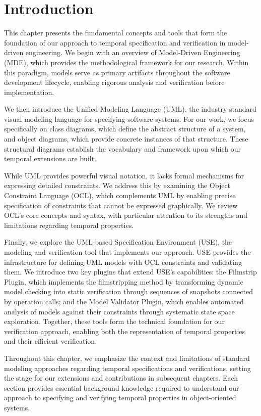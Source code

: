 \setlength{\parindent}{1cm}

\section{Introduction}

\hspace{1cm} This chapter presents the fundamental concepts and tools that form the 
foundation of our approach to temporal specification and verification in model-driven 
engineering. We begin with an overview of Model-Driven Engineering (MDE), which 
provides the methodological framework for our research. Within this paradigm, models 
serve as primary artifacts throughout the software development lifecycle, enabling 
rigorous analysis and verification before implementation.

We then introduce the Unified Modeling Language (UML), the industry-standard visual 
modeling language for specifying software systems. For our work, we focus specifically 
on class diagrams, which define the abstract structure of a system, and object 
diagrams, which provide concrete instances of that structure. These structural 
diagrams establish the vocabulary and framework upon which our temporal extensions 
are built.

While UML provides powerful visual notation, it lacks formal mechanisms for expressing 
detailed constraints. We address this by examining the Object Constraint Language (OCL), 
which complements UML by enabling precise specification of constraints that cannot 
be expressed graphically. We review OCL's core concepts and syntax, with particular 
attention to its strengths and limitations regarding temporal properties.

Finally, we explore the UML-based Specification Environment (USE), the modeling and 
verification tool that implements our approach. USE provides the infrastructure for 
defining UML models with OCL constraints and validating them. We introduce two key 
plugins that extend USE's capabilities: the Filmstrip Plugin, which implements the 
filmstripping method by transforming dynamic model checking into static verification 
through sequences of snapshots connected by operation calls; and the Model Validator 
Plugin, which enables automated analysis of models against their constraints through 
systematic state space exploration. Together, these tools form the technical foundation 
for our verification approach, enabling both the representation of temporal properties 
and their efficient verification.

Throughout this chapter, we emphasize the context and limitations of standard 
modeling approaches regarding temporal specifications and verifications, setting the stage for our 
extensions and contributions in subsequent chapters. Each section provides essential 
background knowledge required to understand our approach to specifying and verifying 
temporal properties in object-oriented systems.

